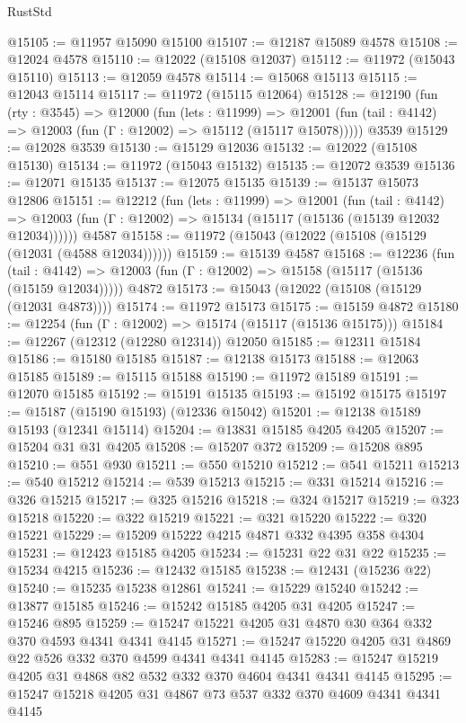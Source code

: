 \begin{lexlean}{RustStd}
\begin{coremodule}
@15105 := @11957 @15090 @15100
@15107 := @12187 @15089 @4578
@15108 := @12024 @4578
@15110 := @12022 (@15108 @12037)
@15112 := @11972 (@15043 @15110)
@15113 := @12059 @4578
@15114 := @15068 @15113
@15115 := @12043 @15114
@15117 := @11972 (@15115 @12064)
@15128 := @12190
    (fun (rty : @3545) =>
    @12000
      (fun (lets : @11999) =>
      @12001 (fun (tail : @4142) => @12003 (fun (Γ : @12002) => @15112 (@15117 @15078)))))
    @3539
@15129 := @12028 @3539
@15130 := @15129 @12036
@15132 := @12022 (@15108 @15130)
@15134 := @11972 (@15043 @15132)
@15135 := @12072 @3539
@15136 := @12071 @15135
@15137 := @12075 @15135
@15139 := @15137 @15073 @12806
@15151 := @12212
    (fun (lets : @11999) =>
    @12001
      (fun (tail : @4142) =>
      @12003 (fun (Γ : @12002) => @15134 (@15117 (@15136 (@15139 @12032 @12034))))))
    @4587
@15158 := @11972 (@15043 (@12022 (@15108 (@15129 (@12031 (@4588 @12034))))))
@15159 := @15139 @4587
@15168 := @12236
    (fun (tail : @4142) => @12003 (fun (Γ : @12002) => @15158 (@15117 (@15136 (@15159 @12034)))))
    @4872
@15173 := @15043 (@12022 (@15108 (@15129 (@12031 @4873))))
@15174 := @11972 @15173
@15175 := @15159 @4872
@15180 := @12254 (fun (Γ : @12002) => @15174 (@15117 (@15136 @15175)))
@15184 := @12267 (@12312 (@12280 @12314)) @12050
@15185 := @12311 @15184
@15186 := @15180 @15185
@15187 := @12138 @15173
@15188 := @12063 @15185
@15189 := @15115 @15188
@15190 := @11972 @15189
@15191 := @12070 @15185
@15192 := @15191 @15135
@15193 := @15192 @15175
@15197 := @15187 (@15190 @15193) (@12336 @15042)
@15201 := @12138 @15189 @15193 (@12341 @15114)
@15204 := @13831 @15185 @4205 @4205
@15207 := @15204 @31 @31 @4205
@15208 := @15207 @372
@15209 := @15208 @895
@15210 := @551 @930
@15211 := @550 @15210
@15212 := @541 @15211
@15213 := @540 @15212
@15214 := @539 @15213
@15215 := @331 @15214
@15216 := @326 @15215
@15217 := @325 @15216
@15218 := @324 @15217
@15219 := @323 @15218
@15220 := @322 @15219
@15221 := @321 @15220
@15222 := @320 @15221
@15229 := @15209 @15222 @4215 @4871 @332 @4395 @358 @4304
@15231 := @12423 @15185 @4205
@15234 := @15231 @22 @31 @22
@15235 := @15234 @4215
@15236 := @12432 @15185
@15238 := @12431 (@15236 @22)
@15240 := @15235 @15238 @12861
@15241 := @15229 @15240
@15242 := @13877 @15185
@15246 := @15242 @15185 @4205 @31 @4205
@15247 := @15246 @895
@15259 := @15247 @15221 @4205 @31 @4870 @30 @364 @332 @370 @4593 @4341 @4341 @4145
@15271 := @15247 @15220 @4205 @31 @4869 @22 @526 @332 @370 @4599 @4341 @4341 @4145
@15283 := @15247 @15219 @4205 @31 @4868 @82 @532 @332 @370 @4604 @4341 @4341 @4145
@15295 := @15247 @15218 @4205 @31 @4867 @73 @537 @332 @370 @4609 @4341 @4341 @4145

\end{coremodule}
\end{lexlean}
